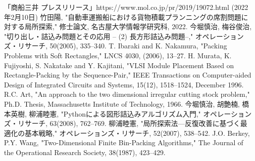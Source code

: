 \documentclass[platex]{jreport}
\begin{document}
\begin{thebibliography}{99}
	「商船三井 プレスリリース」https://www.mol.co.jp/pr/2019/19072.html (2022年2月10日)
	竹田陽, "自動車運搬船における貨物積載プランニングの席割問題に対する局所探索," 修士論文, 名古屋大学情報学研究科, 2022.
	今堀慎治, 梅谷俊治, "切り出し・詰込み問題とその応用 -- (2) 長方形詰込み問題--," オペレーションズ・リサーチ, 50(2005), 335--340.
	T. Ibaraki and K. Nakamura, "Packing Problems with Soft Rectangles," LNCS 4030, (2006), 13--27.
	H. Murata, K. Fujiyoshi, S. Nakatake and Y. Kajitani, "VLSI Module Placement Based on Rectangle-Packing by the Sequence-Pair," 
	IEEE Transactions on Computer-aided Design of Integrated Circuits and Systems, 15(12), 1518--1524, December 1996.
	R.C. Art, "An approach to the two dimensional irregular cutting stock problem,"
	Ph.D. Thesis, Massachusetts Institute of Technology, 1966.
	今堀慎治, 胡艶楠, 橋本英樹, 柳浦睦憲, "Pythonによる図形詰込みアルゴリズム入門," 
	オペレーションズ・リサーチ, 63(2008), 762--769.
	柳浦睦憲, "局所探索法—反復改善に基づく最適化の基本戦略," オペレーションズ・リサーチ, 52(2007), 538--542.
	J.O. Berkey, P.Y. Wang, "Two-Dimensional Finite Bin-Packing Algorithms," 
	The Journal of the Operational Research Society, 38(1987), 423--429. 

\end{thebibliography}
\end{document}
